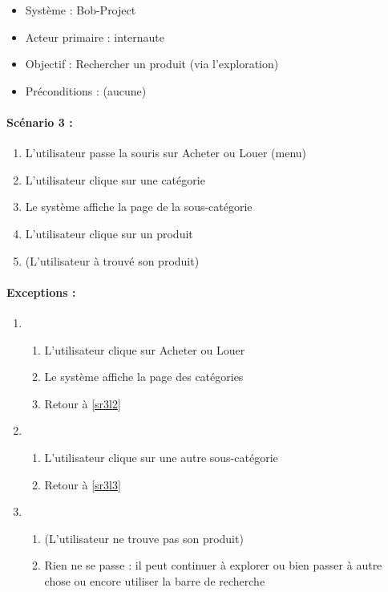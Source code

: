 \begin{boxedminipage}[t]{12cm}
	\begin{itemize}
		\item Système : Bob-Project
		\item Acteur primaire : internaute
		\item Objectif : Rechercher un produit (via l'exploration)
		\item Préconditions : (aucune)
	\end{itemize}

	\renewcommand\theenumi{\arabic{enumi}}
	\renewcommand\labelenumi{\theenumi .}
	\renewcommand\theenumii{\Alph{enumii}}
	\renewcommand\labelenumii{(\theenumii)}
	\paragraph*{Scénario 3 :}
	\begin{enumerate}
		\item \label{sr3l1} L'utilisateur passe la souris sur Acheter ou Louer (menu)
		\item \label{sr3l2} L'utilisateur clique sur une catégorie
		\item \label{sr3l3} Le système affiche la page de la sous-catégorie
		\item \label{sr3l4} L'utilisateur clique sur un produit
		\item \label{sr3l5} (L'utilisateur à trouvé son produit)
	\end{enumerate}

	\renewcommand\theenumi{\Alph{enumi}}
	\renewcommand\labelenumi{\theenumi )}
	\renewcommand\theenumii{\arabic{enumii}}
	\renewcommand\labelenumii{\theenumii .}
	\paragraph*{Exceptions :}
	\begin{enumerate}
		\item
			\begin{enumerate}
				\item L'utilisateur clique sur Acheter ou Louer
				\item Le système affiche la page des catégories
				\item Retour à \ref{sr3l2}
			\end{enumerate}
		\item
			\begin{enumerate}
				\addtocounter{enumii}{3}
				\item L'utilisateur clique sur une autre sous-catégorie
				\item Retour à \ref{sr3l3}
			\end{enumerate}
		\item
			\begin{enumerate}
				\addtocounter{enumii}{4}
				\item (L'utilisateur ne trouve pas son produit)
				\item Rien ne se passe : il peut continuer à explorer ou bien passer à autre chose ou encore utiliser la barre de recherche
			\end{enumerate}
	\end{enumerate}
\end{boxedminipage}
\newpage

\renewcommand\theenumi{\arabic{enumi}}
\renewcommand\labelenumi{\theenumi .}
\renewcommand\theenumii{\Alph{enumii}}
\renewcommand\labelenumii{(\theenumii)}